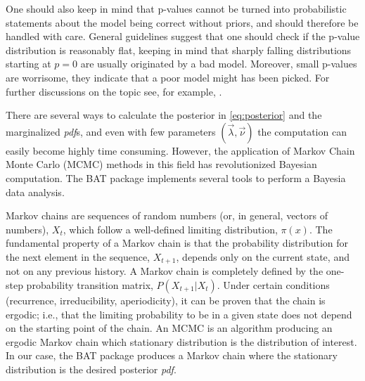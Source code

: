 One should also keep in mind that p-values cannot be turned into probabilistic statements about the model being correct without priors, and should therefore be handled with care. General guidelines suggest that one should check if the p-value distribution is reasonably flat, keeping in mind that sharply falling distributions starting at $p=0$ are usually originated by a bad model. Moreover, small p-values are worrisome, they indicate that a poor model might has been picked. For further discussions on the topic see, for example, \cite{p-value}.

 There are several ways to calculate the posterior in \ref{eq:posterior} and the marginalized \emph{pdf}s, and even with few parameters $(\vec{\lambda},\vec{\nu})$ the computation can easily become highly time consuming. However, the application of Markov Chain Monte Carlo (MCMC) methods in this field has revolutionized Bayesian computation. The BAT package \cite{BAT} implements several tools to perform a Bayesia data analysis.

Markov chains are sequences of random numbers (or, in general, vectors of numbers), $X_t$, which follow a well-defined limiting distribution, $\pi(x)$. The fundamental property of a Markov chain is that the probability distribution for the next element in the sequence, $X_{t+1}$, depends only on the current state, and not on any previous history. A Markov chain is completely defined by the one-step probability transition matrix, $P(X_{t+1}|X_t)$. Under certain conditions (recurrence, irreducibility, aperiodicity), it can be proven that the chain is ergodic; i.e., that the limiting probability to be in a given state does not depend on the starting point of the chain. An MCMC is an algorithm producing an ergodic Markov chain which stationary distribution is the distribution of interest. In our case, the BAT package produces a Markov chain where the stationary distribution is the desired posterior \emph{pdf}.

